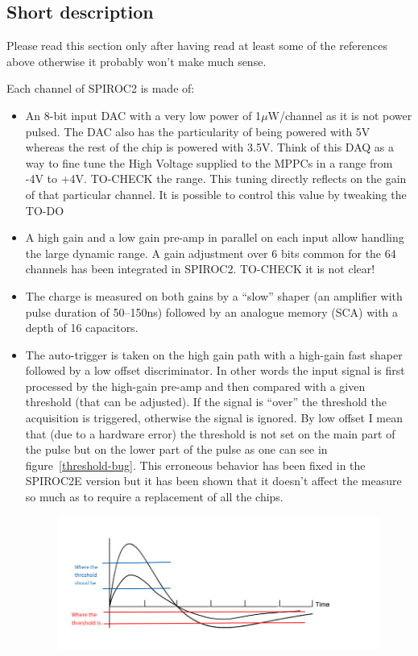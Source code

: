 \subsection{Short description}
Please read this section only after having read at least some of the references
above otherwise it probably won't make much sense.

Each channel of SPIROC2 is made of:
\begin{itemize}
\item An 8-bit input DAC with a very low power of 1$\mu$W/channel as it is not
  power pulsed. The DAC also has the particularity of being powered with 5V
  whereas the rest of the chip is powered with 3.5V. Think of this DAQ as a way
  to fine tune the High Voltage supplied to the MPPCs in a range from -4V to
  +4V. TO-CHECK the range. This tuning directly reflects on the gain of that
  particular channel. It is possible to control this value by tweaking the TO-DO
\item A high gain and a low gain pre-amp in parallel on each input allow
  handling the large dynamic range. A gain adjustment over 6 bits common for the
  64 channels has been integrated in SPIROC2. TO-CHECK it is not clear!
\item The charge is measured on both gains by a ``slow'' shaper (an amplifier
  with pulse duration of 50–150ns) followed by an analogue memory (SCA) with a
  depth of 16 capacitors.
\item The auto-trigger is taken on the high gain path with a high-gain fast
  shaper followed by a low offset discriminator. In other words the input signal
  is first processed by the high-gain pre-amp and then compared with a given
  threshold (that can be adjusted). If the signal is ``over'' the threshold the
  acquisition is triggered, otherwise the signal is ignored. By low offset I
  mean that (due to a hardware error) the threshold is not set on the main part
  of the pulse but on the lower part of the pulse as one can see in
  figure~\ref{threshold-bug}. This erroneous behavior has been fixed in the
  SPIROC2E version but it has been shown that it doesn't affect the measure so
  much as to require a replacement of all the chips.
  \begin{figure}[ht]
    \includegraphics[width=\linewidth]{threshold-bug.png}

\end{figure}
\end{itemize}
